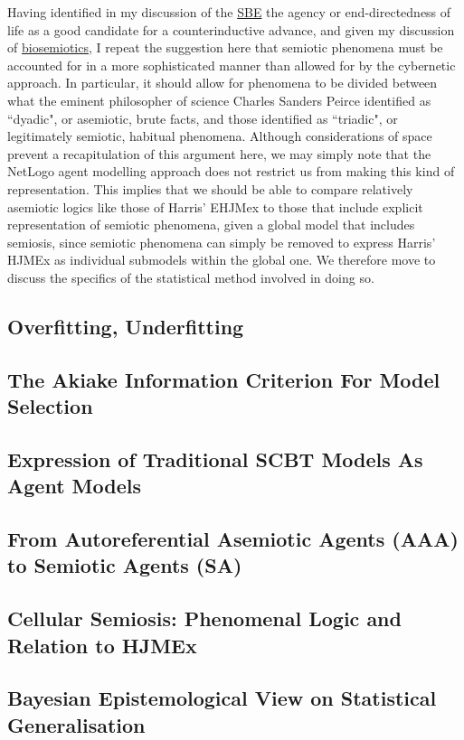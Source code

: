  Having identified in my discussion of the \hyperref[SBE]{SBE} the agency or end-directedness of life as a good candidate for a counterinductive advance, and given my discussion of \hyperref[semiosis]{biosemiotics}, I repeat the suggestion here that semiotic phenomena must be accounted for in a more sophisticated manner than allowed for by the cybernetic approach. In particular, it should allow for phenomena to be divided between what the eminent philosopher of science Charles Sanders Peirce identified as ``dyadic", or asemiotic, brute facts, and those identified as ``triadic", or legitimately semiotic, habitual phenomena. Although considerations of space prevent a recapitulation of this argument here, we may simply note that the NetLogo agent modelling approach does not restrict us from making this kind of representation. This implies that we should be able to compare relatively asemiotic logics like those of Harris' EHJMex to those that include explicit representation of semiotic phenomena, given a global model that includes semiosis, since semiotic phenomena can simply be removed to express Harris' HJMEx as individual submodels within the global one. We therefore move to discuss the specifics of the statistical method involved in doing so.
 
\subsection{Overfitting, Underfitting}

\subsection{The Akiake Information Criterion For Model Selection}
 



\subsection{Expression of Traditional SCBT Models As Agent Models}
\subsection{From Autoreferential Asemiotic Agents (AAA) to Semiotic Agents (SA)}
\subsection{Cellular Semiosis: Phenomenal Logic and Relation to HJMEx}
\subsection{Bayesian Epistemological View on Statistical Generalisation}
\label{Bayes}
